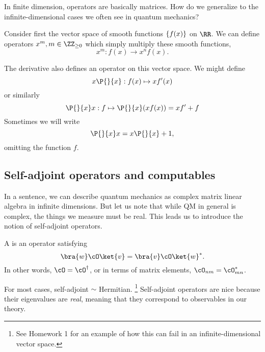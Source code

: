 In finite dimension, operators are basically matrices. How do we generalize to the infinite-dimensional cases we often see in quantum mechanics? 
\begin{exm}
    Consider first the vector space of smooth functions $\{f(x)\}$ on $\RR$. We can define operators $x^m, m\in \ZZ_{\geq 0}$ which simply multiply these smooth functions,
    \begin{equation}
        x^m: f(x) \to x^n f(x).
    \end{equation}
\end{exm}
\begin{exm}
    The derivative also defines an operator on this vector space.
    We might define 
    \begin{equation}
        x\P{}{x}:f(x)\mapsto x f'(x)
    \end{equation}
    or similarly
    \begin{equation}
        \P{}{x} x : f\mapsto \P{}{x}(xf(x))=xf'+f
    \end{equation}
    Sometimes we will write
    \begin{equation}
        \P{}{x} x = x\P{}{x}+1,
    \end{equation}
    omitting the function $f$.
\end{exm}

\subsection*{Self-adjoint operators and computables}
In a sentence, we can describe quantum mechanics as complex matrix linear algebra in infinite dimensions. But let us note that while QM in general is complex, the things we measure must be real. This leads us to introduce the notion of self-adjoint operators.
\begin{defn}
    A  is an operator satisfying
    \begin{equation}
        \bra{w} \cO\ket{v} =\bra{v}\cO \ket{w}^*.
    \end{equation}
    In other words, $\cO=\cO^\dagger$, or in terms of matrix elements, $\cO_{nm}=\cO^*_{mn}$.
\end{defn}
For most cases, self-adjoint $\sim$ Hermitian.%
    \footnote{See Homework 1 for an example of how this can fail in an infinite-dimensional vector space.}
Self-adjoint operators are nice because their eigenvalues are \emph{real}, meaning that they correspond to observables in our theory.
    
